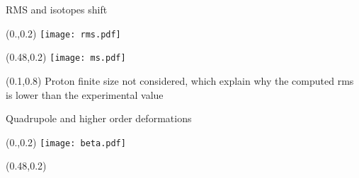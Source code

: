 \documentclass[10pt,aspectratio=169]{beamer}
\begin{document}
\begin{frame}{RMS and isotopes shift}

    \centering 

    \begin{textblock*}{0.5\paperwidth}(0.\paperwidth,0.2\paperheight)
        \centering
        \texttt{[image: rms.pdf]}
    \end{textblock*}
    \begin{textblock*}{0.5\paperwidth}(0.48\paperwidth,0.2\paperheight)
        \centering
        \texttt{[image: ms.pdf]}
    \end{textblock*}
    \begin{textblock*}{0.8\paperwidth}(0.1\paperwidth,0.8\paperheight)
        Proton finite size not considered, which explain why the computed rms is lower than the experimental value
    \end{textblock*}
\end{frame}


\begin{frame}{Quadrupole and higher order deformations}

    \centering 
    \begin{textblock*}{0.5\paperwidth}(0.\paperwidth,0.2\paperheight)
        \centering
        \texttt{[image: beta.pdf]}
    \end{textblock*}
    \begin{textblock*}{0.5\paperwidth}(0.48\paperwidth,0.2\paperheight)

    \end{textblock*}
\end{frame}
\end{document}
